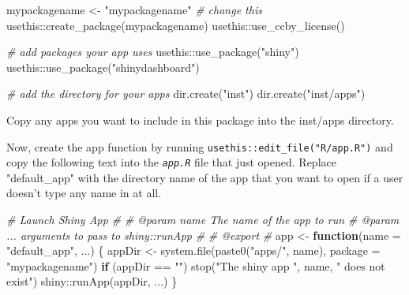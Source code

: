 \documentclass[
  oneside]{book}
\newenvironment{Shaded}{\begin{snugshade}}{\end{snugshade}}
\newcommand{\AttributeTok}[1]{\textcolor[rgb]{0.77,0.63,0.00}{#1}}
\newcommand{\CommentTok}[1]{\textcolor[rgb]{0.56,0.35,0.01}{\textit{#1}}}
\newcommand{\ControlFlowTok}[1]{\textcolor[rgb]{0.13,0.29,0.53}{\textbf{#1}}}
\newcommand{\FunctionTok}[1]{\textcolor[rgb]{0.00,0.00,0.00}{#1}}
\newcommand{\NormalTok}[1]{#1}
\newcommand{\OtherTok}[1]{\textcolor[rgb]{0.56,0.35,0.01}{#1}}
\newcommand{\SpecialCharTok}[1]{\textcolor[rgb]{0.00,0.00,0.00}{#1}}
\newcommand{\StringTok}[1]{\textcolor[rgb]{0.31,0.60,0.02}{#1}}
\begin{document}
\begin{Shaded}
\begin{Highlighting}[]
\NormalTok{mypackagename }\OtherTok{\textless{}{-}} \StringTok{"mypackagename"} \CommentTok{\# change this}
\NormalTok{usethis}\SpecialCharTok{::}\FunctionTok{create\_package}\NormalTok{(mypackagename)}
\NormalTok{usethis}\SpecialCharTok{::}\FunctionTok{use\_ccby\_license}\NormalTok{()}

\CommentTok{\# add packages your app uses}
\NormalTok{usethis}\SpecialCharTok{::}\FunctionTok{use\_package}\NormalTok{(}\StringTok{"shiny"}\NormalTok{)}
\NormalTok{usethis}\SpecialCharTok{::}\FunctionTok{use\_package}\NormalTok{(}\StringTok{"shinydashboard"}\NormalTok{)}

\CommentTok{\# add the directory for your apps}
\FunctionTok{dir.create}\NormalTok{(}\StringTok{"inst"}\NormalTok{)}
\FunctionTok{dir.create}\NormalTok{(}\StringTok{"inst/apps"}\NormalTok{)}
\end{Highlighting}
\end{Shaded}

Copy any apps you want to include in this package into the inst/apps directory.

Now, create the app function by running \texttt{usethis::edit\_file("R/app.R")} and copy the following text into the \textit{\texttt{app.R}} file that just opened. Replace \StringTok{"default\_app"} with the directory name of the app that you want to open if a user doesn't type any name in at all.

\begin{Shaded}
\begin{Highlighting}[]
\CommentTok{\#\textquotesingle{} Launch Shiny App}
\CommentTok{\#\textquotesingle{}}
\CommentTok{\#\textquotesingle{} @param name The name of the app to run}
\CommentTok{\#\textquotesingle{} @param ... arguments to pass to shiny::runApp}
\CommentTok{\#\textquotesingle{}}
\CommentTok{\#\textquotesingle{} @export}
\CommentTok{\#\textquotesingle{}}
\NormalTok{app }\OtherTok{\textless{}{-}} \ControlFlowTok{function}\NormalTok{(}\AttributeTok{name =} \StringTok{"default\_app"}\NormalTok{, ...) \{}
\NormalTok{  appDir }\OtherTok{\textless{}{-}} \FunctionTok{system.file}\NormalTok{(}\FunctionTok{paste0}\NormalTok{(}\StringTok{"apps/"}\NormalTok{, name), }\AttributeTok{package =} \StringTok{"mypackagename"}\NormalTok{)}
  \ControlFlowTok{if}\NormalTok{ (appDir }\SpecialCharTok{==} \StringTok{""}\NormalTok{) }\FunctionTok{stop}\NormalTok{(}\StringTok{"The shiny app "}\NormalTok{, name, }\StringTok{" does not exist"}\NormalTok{)}
\NormalTok{  shiny}\SpecialCharTok{::}\FunctionTok{runApp}\NormalTok{(appDir, ...)}
\NormalTok{\}}
\end{Highlighting}
\end{Shaded}
\end{document}
